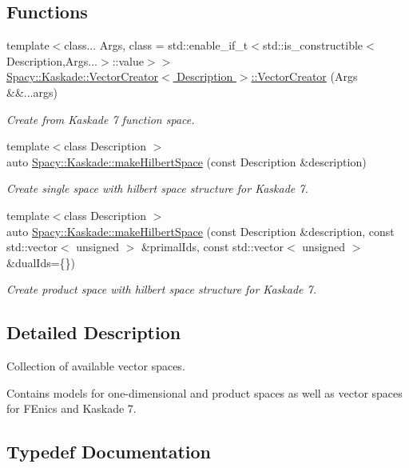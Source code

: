 \subsection*{Functions}
\begin{DoxyCompactItemize}
\item 
{\footnotesize template$<$class... Args, class  = std\+::enable\+\_\+if\+\_\+t$<$std\+::is\+\_\+constructible$<$\+Description,\+Args...$>$\+::value$>$$>$ }\\\hyperlink{group__VectorSpaceGroup_ga89de372343310640870077e6167df3f4}{Spacy\+::\+Kaskade\+::\+Vector\+Creator$<$ Description $>$\+::\+Vector\+Creator} (Args \&\&...args)
\begin{DoxyCompactList}\small\item\em Create from Kaskade 7 function space. \end{DoxyCompactList}\item 
{\footnotesize template$<$class Description $>$ }\\auto \hyperlink{group__VectorSpaceGroup_ga04d45446864bbf87770d02eade7b64cf}{Spacy\+::\+Kaskade\+::make\+Hilbert\+Space} (const Description \&description)
\begin{DoxyCompactList}\small\item\em Create single space with hilbert space structure for Kaskade 7. \end{DoxyCompactList}\item 
{\footnotesize template$<$class Description $>$ }\\auto \hyperlink{group__VectorSpaceGroup_ga221db25c41371a2a823a6b569d735ef6}{Spacy\+::\+Kaskade\+::make\+Hilbert\+Space} (const Description \&description, const std\+::vector$<$ unsigned $>$ \&primal\+Ids, const std\+::vector$<$ unsigned $>$ \&dual\+Ids=\{\})
\begin{DoxyCompactList}\small\item\em Create product space with hilbert space structure for Kaskade 7. \end{DoxyCompactList}\end{DoxyCompactItemize}


\subsection{Detailed Description}
Collection of available vector spaces. 

Contains models for one-\/dimensional and product spaces as well as vector spaces for F\+Enics and Kaskade 7. 

\subsection{Typedef Documentation}
